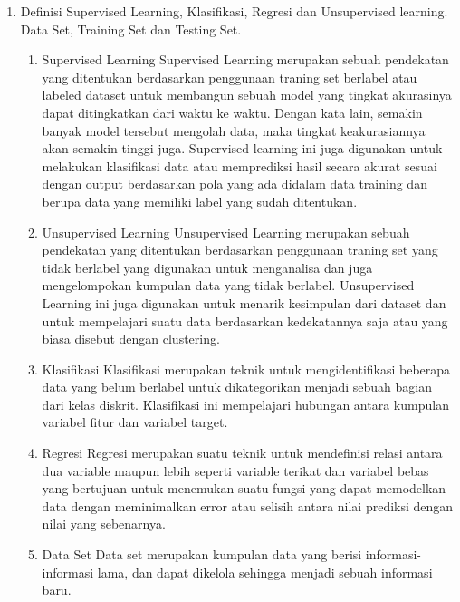 \begin{enumerate}
\begin{enumerate}
	\end{enumerate}

\item
Definisi Supervised Learning, Klasifikasi, Regresi dan Unsupervised learning. Data Set, Training Set dan Testing Set.

	\begin{enumerate}
		\item Supervised Learning
		\newline Supervised Learning merupakan sebuah pendekatan yang ditentukan berdasarkan penggunaan traning set berlabel atau labeled dataset untuk membangun sebuah model yang tingkat akurasinya dapat ditingkatkan dari waktu ke waktu. Dengan kata lain, semakin banyak model tersebut mengolah data, maka tingkat keakurasiannya akan semakin tinggi juga. Supervised learning ini juga digunakan untuk melakukan klasifikasi data atau memprediksi hasil secara akurat sesuai dengan output berdasarkan pola yang ada didalam data training dan berupa data yang memiliki label yang sudah ditentukan.
		
		\item Unsupervised Learning
		\newline Unsupervised Learning merupakan sebuah pendekatan yang ditentukan berdasarkan penggunaan traning set yang tidak berlabel yang digunakan untuk menganalisa dan juga mengelompokan kumpulan data yang tidak berlabel.  Unsupervised Learning ini juga digunakan untuk menarik kesimpulan dari dataset dan untuk mempelajari suatu data berdasarkan kedekatannya saja atau yang biasa disebut dengan clustering.
		
		\item Klasifikasi
		\newline Klasifikasi merupakan teknik untuk mengidentifikasi beberapa data yang belum berlabel untuk dikategorikan menjadi sebuah bagian dari kelas diskrit. Klasifikasi ini  mempelajari hubungan antara kumpulan variabel fitur dan variabel target.
		
		\item Regresi
		\newline Regresi merupakan suatu teknik untuk mendefinisi relasi antara dua variable maupun lebih seperti variable terikat dan variabel bebas yang bertujuan untuk menemukan suatu fungsi yang dapat memodelkan data dengan meminimalkan error atau selisih antara nilai prediksi dengan nilai yang sebenarnya.
		
		\item Data Set
		\newline Data set merupakan kumpulan data yang berisi informasi-informasi lama, dan dapat dikelola sehingga menjadi sebuah informasi baru. 
		

\end{enumerate}
\end{enumerate}
